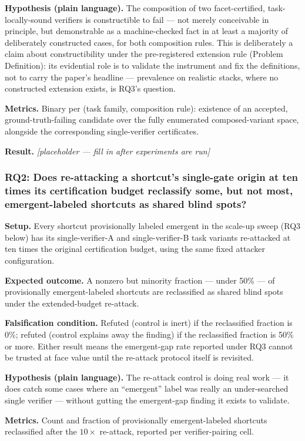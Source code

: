\documentclass[11pt]{article}
\newcommand{\ph}{\textit{[placeholder --- fill in after experiments are run]}}
\begin{document}
\textbf{Hypothesis (plain language).} The composition of two facet-certified, task-locally-sound verifiers is constructible to fail --- not merely conceivable in principle, but demonstrable as a machine-checked fact in at least a majority of deliberately constructed cases, for both composition rules. This is deliberately a claim about constructibility under the pre-registered extension rule (Problem Definition): its evidential role is to validate the instrument and fix the definitions, not to carry the paper's headline --- prevalence on realistic stacks, where no constructed extension exists, is RQ3's question.

\textbf{Metrics.} Binary per (task family, composition rule): existence of an accepted, ground-truth-failing candidate over the fully enumerated composed-variant space, alongside the corresponding single-verifier certificates.

\textbf{Result.} \ph

\subsubsection{RQ2: Does re-attacking a shortcut's single-gate origin at ten times its certification budget reclassify some, but not most, emergent-labeled shortcuts as shared blind spots?}
\textbf{Setup.} Every shortcut provisionally labeled emergent in the scale-up sweep (RQ3 below) has its single-verifier-A and single-verifier-B task variants re-attacked at ten times the original certification budget, using the same fixed attacker configuration.

\textbf{Expected outcome.} A nonzero but minority fraction --- under 50\% --- of provisionally emergent-labeled shortcuts are reclassified as shared blind spots under the extended-budget re-attack.

\textbf{Falsification condition.} Refuted (control is inert) if the reclassified fraction is 0\%; refuted (control explains away the finding) if the reclassified fraction is 50\% or more. Either result means the emergent-gap rate reported under RQ3 cannot be trusted at face value until the re-attack protocol itself is revisited.

\textbf{Hypothesis (plain language).} The re-attack control is doing real work --- it does catch some cases where an ``emergent'' label was really an under-searched single verifier --- without gutting the emergent-gap finding it exists to validate.

\textbf{Metrics.} Count and fraction of provisionally emergent-labeled shortcuts reclassified after the $10\times$ re-attack, reported per verifier-pairing cell.
\end{document}
